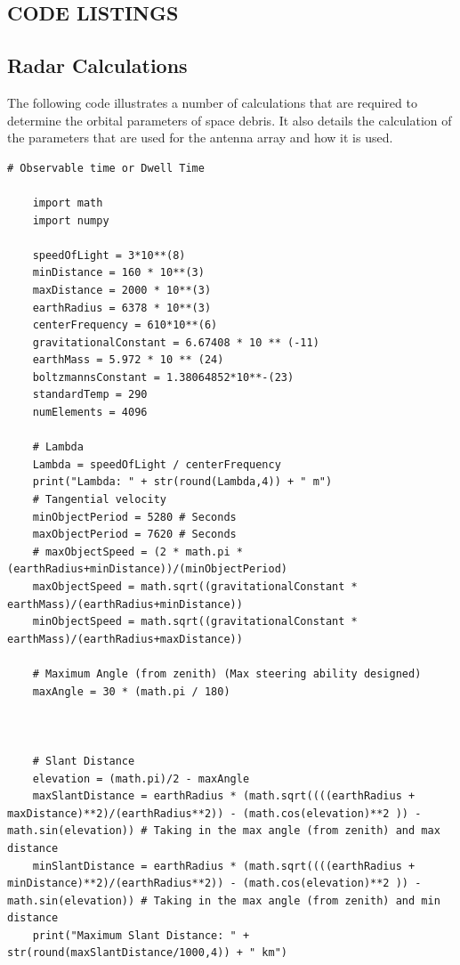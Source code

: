 \documentclass[11pt]{witseiepaper}
\begin{document}
\begin{bibunit}[witseie]
\section{CODE LISTINGS} \label{sec:CodeListings}

\subsection{Radar Calculations} \label{sec:RadarCalculations}
The following code illustrates a number of calculations that are required to determine the orbital parameters of space debris. It also details the calculation of the parameters that are used for the antenna array and how it is used.


\begin{lstlisting}[breaklines=true, postbreak=\mbox{\textcolor{red}{$\hookrightarrow$}\space}]
    # Observable time or Dwell Time

    import math
    import numpy
    
    speedOfLight = 3*10**(8)
    minDistance = 160 * 10**(3)
    maxDistance = 2000 * 10**(3)
    earthRadius = 6378 * 10**(3)
    centerFrequency = 610*10**(6)
    gravitationalConstant = 6.67408 * 10 ** (-11)
    earthMass = 5.972 * 10 ** (24)
    boltzmannsConstant = 1.38064852*10**-(23)
    standardTemp = 290
    numElements = 4096
    
    # Lambda
    Lambda = speedOfLight / centerFrequency
    print("Lambda: " + str(round(Lambda,4)) + " m")
    # Tangential velocity
    minObjectPeriod = 5280 # Seconds
    maxObjectPeriod = 7620 # Seconds
    # maxObjectSpeed = (2 * math.pi * (earthRadius+minDistance))/(minObjectPeriod)
    maxObjectSpeed = math.sqrt((gravitationalConstant * earthMass)/(earthRadius+minDistance))
    minObjectSpeed = math.sqrt((gravitationalConstant * earthMass)/(earthRadius+maxDistance))
    
    # Maximum Angle (from zenith) (Max steering ability designed)
    maxAngle = 30 * (math.pi / 180)
    
    
    
    # Slant Distance
    elevation = (math.pi)/2 - maxAngle
    maxSlantDistance = earthRadius * (math.sqrt((((earthRadius + maxDistance)**2)/(earthRadius**2)) - (math.cos(elevation)**2 )) - math.sin(elevation)) # Taking in the max angle (from zenith) and max distance
    minSlantDistance = earthRadius * (math.sqrt((((earthRadius + minDistance)**2)/(earthRadius**2)) - (math.cos(elevation)**2 )) - math.sin(elevation)) # Taking in the max angle (from zenith) and min distance
    print("Maximum Slant Distance: " + str(round(maxSlantDistance/1000,4)) + " km")
    

\end{lstlisting}
\end{bibunit}
\end{document}

